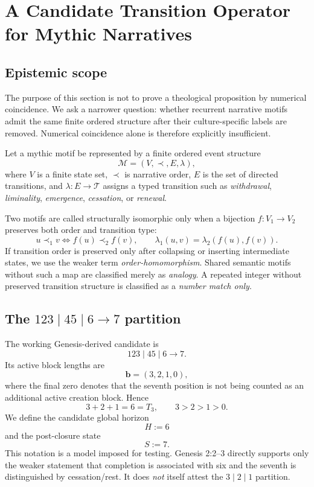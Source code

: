 \section{A Candidate Transition Operator for Mythic Narratives}
\label{sec:transition-operator}

\subsection{Epistemic scope}

The purpose of this section is not to prove a theological proposition by
numerical coincidence. We ask a narrower question: whether recurrent
narrative motifs admit the same finite ordered structure after their
culture-specific labels are removed. Numerical coincidence alone is
therefore explicitly insufficient.

Let a mythic motif be represented by a finite ordered event structure
\[
\mathcal{M}=(V,\prec,E,\lambda),
\]
where \(V\) is a finite state set, \(\prec\) is narrative order, \(E\) is the
set of directed transitions, and \(\lambda:E\to\mathcal{T}\) assigns a typed
transition such as \emph{withdrawal}, \emph{liminality}, \emph{emergence},
\emph{cessation}, or \emph{renewal}.

Two motifs are called structurally isomorphic only when a bijection
\(f:V_1\to V_2\) preserves both order and transition type:
\[
u\prec_1 v \iff f(u)\prec_2 f(v),
\qquad
\lambda_1(u,v)=\lambda_2(f(u),f(v)).
\]
If transition order is preserved only after collapsing or inserting
intermediate states, we use the weaker term \emph{order-homomorphism}.
Shared semantic motifs without such a map are classified merely as
\emph{analogy}. A repeated integer without preserved transition structure is
classified as a \emph{number match only}.

\subsection{The \texorpdfstring{\(123\mid45\mid6\to7\)}{123|45|6 to 7} partition}

The working Genesis-derived candidate is
\[
123\mid45\mid6\longrightarrow7.
\]
Its active block lengths are
\[
\mathbf b=(3,2,1,0),
\]
where the final zero denotes that the seventh position is not being counted
as an additional active creation block. Hence
\[
3+2+1=6=T_3,
\qquad
3>2>1>0.
\]
We define the candidate global horizon
\[
H:=6
\]
and the post-closure state
\[
S:=7.
\]
This notation is a model imposed for testing. Genesis 2:2--3 directly
supports only the weaker statement that completion is associated with six
and the seventh is distinguished by cessation/rest. It does \emph{not}
itself attest the \(3\mid2\mid1\) partition.

